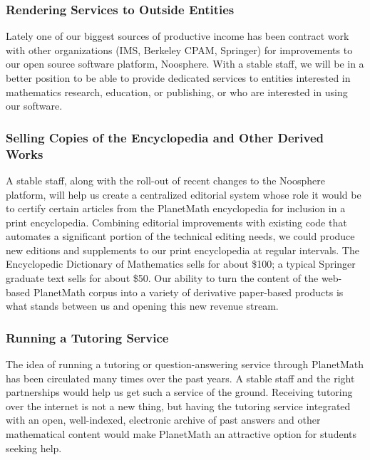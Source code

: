 \subsubsection*{Rendering Services to Outside Entities}
Lately one of our biggest sources of productive income has been contract work
with other organizations (IMS, Berkeley CPAM, Springer) for improvements to our
open source software platform, Noosphere. With a stable staff, we will be in a
better position to be able to provide dedicated services to entities interested
in mathematics research, education, or publishing, or who are interested in
using our software.

\subsubsection*{Selling Copies of the Encyclopedia and Other Derived Works}
A stable staff, along with the roll-out of recent changes to the Noosphere
platform, will help us create a centralized editorial system whose role it
would be to certify certain articles from the PlanetMath encyclopedia for
inclusion in a print encyclopedia. Combining editorial improvements with
existing code that automates a significant portion of the technical editing
needs, we could produce new editions and supplements to our print encyclopedia
at regular intervals. The Encyclopedic Dictionary of Mathematics sells for
about \$100; a typical Springer graduate text sells for about \$50. Our ability
to turn the content of the web-based PlanetMath corpus into a variety of
derivative paper-based products is what stands between us and opening this new
revenue stream.

\subsubsection*{Running a Tutoring Service}
The idea of running a tutoring or question-answering service through PlanetMath
has been circulated many times over the past years. A stable staff and the
right partnerships would help us get such a service of the ground. Receiving
tutoring over the internet is not a new thing, but having the tutoring service
integrated with an open, well-indexed, electronic archive of past answers and
other mathematical content would make PlanetMath an attractive option for
students seeking help.

